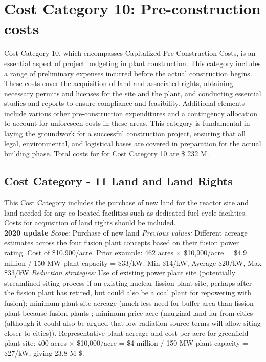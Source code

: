 \section{Cost Category 10: Pre-construction costs} 

Cost Category 10, which encompasses Capitalized Pre-Construction Costs, is an essential aspect of project budgeting in plant construction. This category includes a range of preliminary expenses incurred before the actual construction begins. These costs cover the acquisition of land and associated rights, obtaining necessary permits and licenses for the site and the plant, and conducting essential studies and reports to ensure compliance and feasibility. Additional elements include various other pre-construction expenditures and a contingency allocation to account for unforeseen costs in these areas. This category is fundamental in laying the groundwork for a successful construction project, ensuring that all legal, environmental, and logistical bases are covered in preparation for the actual building phase.  Total costs for for Cost Category 10 are \$ 232 M.

\subsection*{Cost Category - 11 Land and Land Rights}
This Cost Category includes the purchase of new land for the reactor site and land needed for any co-located facilities such as dedicated fuel cycle facilities.  Costs for acquisition of land rights should be included. \\

 \textbf{2020 update} 
\emph{Scope: }Purchase of new land 
 \emph{Previous values: } 
Different acreage estimates across the four fusion plant concepts based on their fusion power rating. Cost of \$10,900/acre. 
Prior example: 462 acres $\times$ \$10,900/acre = \$4.9 million / 150 MW plant capacity =  \$33/kW.  Min \$14/kW, Average \$20/kW, Max \$33/kW  
 \emph{Reduction strategies: } 
 Use of existing power plant site (potentially streamlined siting process if an existing nuclear fission plant site, perhaps after the fission plant has retired, but could also be a coal plant for repowering with fusion); minimum plant site acreage (much less need for buffer area than fission plant because fusion plants ; minimum price acre (marginal land far from cities (although it could also be argued that low radiation source terms will allow siting closer to cities)). 
Representative plant acreage and cost per acre for greenfield plant site: 400 acres $\times$ \$10,000/acre = \$4 million / 150 MW plant capacity = \$27/kW, giving 23.8 M \$.  \\

